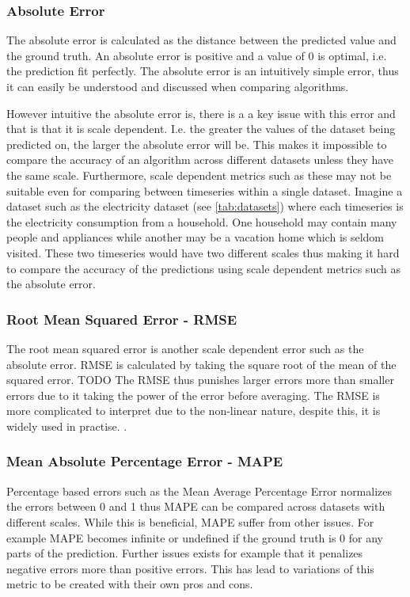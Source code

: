 \subsubsection{Absolute Error} 
The absolute error is calculated as the distance between the predicted value and the ground truth. An absolute error is positive and a value of 0 is optimal, i.e. the prediction fit perfectly. The absolute error is an intuitively simple error, thus it can easily be understood and discussed when comparing algorithms. 

However intuitive the absolute error is, there is a a key issue with this error and that is that it is scale dependent. I.e. the greater the values of the dataset being predicted on, the larger the absolute error will be. This makes it impossible to compare the accuracy of an algorithm across different datasets unless they have the same scale. \cite{hyndman_forecasting_nodate} Furthermore, scale dependent metrics such as these may not be suitable even for comparing between timeseries within a single dataset. Imagine a dataset such as the electricity dataset (see \ref{tab:datasets}) where each timeseries is the electricity consumption from a household. One household may contain many people and appliances while another may be a vacation home which is seldom visited. These two timeseries would have two different scales thus making it hard to compare the accuracy of the predictions using scale dependent metrics such as the absolute error. 

\subsubsection{Root Mean Squared Error - RMSE}
The root mean squared error is another scale dependent error such as the absolute error. RMSE is calculated by taking the square root of the mean of the squared error. TODO The RMSE thus punishes larger errors more than smaller errors due to it taking the power of the error before averaging. The RMSE is more complicated to interpret due to the non-linear nature, despite this, it is widely used in practise. \cite{hyndman_forecasting_nodate}.

\subsubsection{Mean Absolute Percentage Error - MAPE}
Percentage based errors such as the Mean Average Percentage Error normalizes the errors between 0 and 1 thus MAPE can be compared across datasets with different scales. While this is beneficial, MAPE suffer from other issues. For example MAPE becomes infinite or undefined if the ground truth is 0 for any parts of the prediction. Further issues exists for example that it penalizes negative errors more than positive errors. This has lead to variations of this metric to be created with their own pros and cons. \cite{hyndman_forecasting_nodate}

